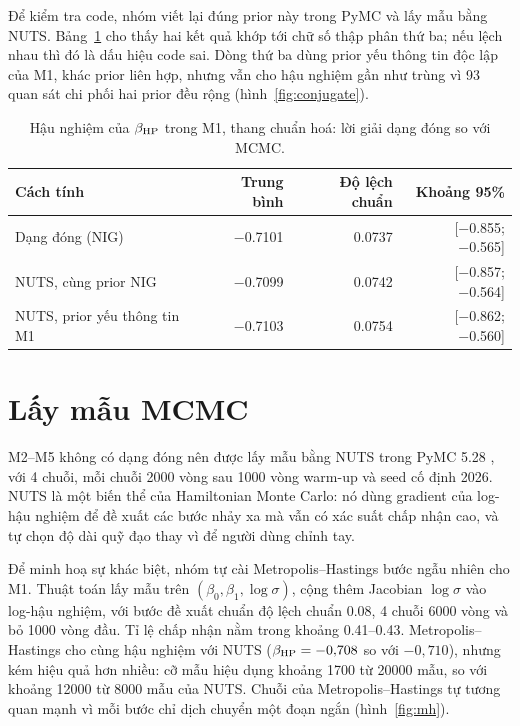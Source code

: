 \documentclass[12pt,a4paper]{report}
\begin{document}
Để kiểm tra code, nhóm viết lại đúng prior này trong PyMC và lấy mẫu bằng NUTS.
Bảng~\ref{tab:conjugate} cho thấy hai kết quả khớp tới chữ số thập phân thứ ba;
nếu lệch nhau thì đó là dấu hiệu code sai. Dòng thứ ba dùng prior yếu thông tin
độc lập của M1, khác prior liên hợp, nhưng vẫn cho hậu nghiệm gần như trùng vì
93 quan sát chi phối hai prior đều rộng (hình~\ref{fig:conjugate}).

\begin{table}[tp]
  \centering
  \caption{Hậu nghiệm của $\beta_{\mathrm{HP}}$ trong M1, thang chuẩn hoá: lời giải dạng
    đóng so với MCMC.}
  \label{tab:conjugate}
  \begin{tabular}{lrrr}
    \toprule
    Cách tính & Trung bình & Độ lệch chuẩn & Khoảng 95\% \\
    \midrule
    Dạng đóng (NIG)              & \num{-0.7101} & \num{0.0737} & [\num{-0.855}; \num{-0.565}] \\
    NUTS, cùng prior NIG         & \num{-0.7099} & \num{0.0742} & [\num{-0.857}; \num{-0.564}] \\
    NUTS, prior yếu thông tin M1 & \num{-0.7103} & \num{0.0754} & [\num{-0.862}; \num{-0.560}] \\
    \bottomrule
  \end{tabular}
\end{table}


\section{Lấy mẫu MCMC}
\label{sec:mcmc}

M2--M5 không có dạng đóng nên được lấy mẫu bằng NUTS \cite{hoffman2014nuts}
trong PyMC 5.28 \cite{abrilpla2023pymc}, với 4 chuỗi, mỗi chuỗi \num{2000} vòng
sau \num{1000} vòng warm-up và seed cố định 2026. NUTS là một biến thể của
Hamiltonian Monte Carlo: nó dùng gradient của log-hậu nghiệm để đề xuất các bước
nhảy xa mà vẫn có xác suất chấp nhận cao, và tự chọn độ dài quỹ đạo thay vì để
người dùng chỉnh tay.

Để minh hoạ sự khác biệt, nhóm tự cài Metropolis--Hastings bước ngẫu nhiên cho
M1. Thuật toán lấy mẫu trên $(\beta_0, \beta_1, \log\sigma)$, cộng thêm Jacobian
$\log\sigma$ vào log-hậu nghiệm, với bước đề xuất chuẩn độ lệch chuẩn
\num{0.08}, 4 chuỗi \num{6000} vòng và bỏ \num{1000} vòng đầu. Tỉ lệ chấp nhận
nằm trong khoảng \num{0.41}--\num{0.43}. Metropolis--Hastings cho cùng hậu
nghiệm với NUTS ($\beta_{\mathrm{HP}} = -0{,}708$ so với $-0{,}710$), nhưng kém hiệu quả
hơn nhiều: cỡ mẫu hiệu dụng khoảng \num{1700} từ \num{20000} mẫu, so với khoảng
\num{12000} từ \num{8000} mẫu của NUTS. Chuỗi của Metropolis--Hastings tự tương
quan mạnh vì mỗi bước chỉ dịch chuyển một đoạn ngắn (hình~\ref{fig:mh}).
\end{document}
